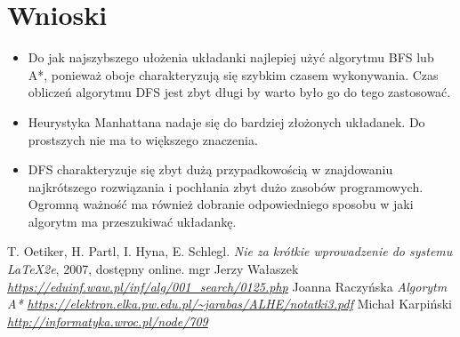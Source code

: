 \documentclass{classrep}
\begin{document}
\section{Wnioski}
{
\begin{itemize}
	\item Do jak najszybszego ułożenia układanki najlepiej użyć algorytmu BFS lub A*, ponieważ oboje charakteryzują się szybkim czasem wykonywania. Czas obliczeń algorytmu DFS jest zbyt długi by warto było go do tego zastosować.
	\item Heurystyka Manhattana nadaje się do bardziej złożonych układanek. Do prostszych nie ma to większego znaczenia.
	\item DFS charakteryzuje się zbyt dużą przypadkowością w znajdowaniu najkrótszego rozwiązania i pochłania zbyt dużo zasobów programowych. Ogromną ważność ma również dobranie odpowiedniego sposobu w jaki algorytm ma przeszukiwać układankę.
\end{itemize}
}

\begin{thebibliography}{0}
   T. Oetiker, H. Partl, I. Hyna, E. Schlegl.
    \textsl{Nie za krótkie wprowadzenie do systemu \LaTeX2e}, 2007, dostępny
    online.
  mgr Jerzy Wałaszek
	\textsl{\url{https://eduinf.waw.pl/inf/alg/001_search/0125.php}}
 Joanna Raczyńska
	\textsl{Algorytm A* \url{https://elektron.elka.pw.edu.pl/~jarabas/ALHE/notatki3.pdf}}
 Michał Karpiński
	\textsl{\url{http://informatyka.wroc.pl/node/709}}
\end{thebibliography}
\end{document}
